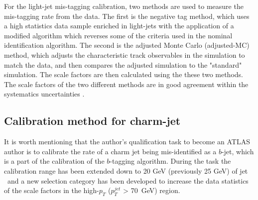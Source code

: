\documentclass[letterpaper,12pt]{article}
\begin{document}
For the light-jet mis-tagging calibration, two methods are 
used to measure the mis-tagging rate from the data. The first is the 
negative tag method, which uses a high statistics data sample enriched 
in light-jets with the application of a modified algorithm which 
reverses some of the criteria used in the nominal identification 
algorithm.
The second is the adjusted Monte Carlo (adjusted-MC) method, which 
adjusts the characteristic track observables in the simulation 
to match the data, and then compares the adjusted simulation to the 
"standard" simulation. The scale factors are then calculated using 
the these two methods. The scale factors of the two different methods 
are in good agreement within the systematics uncertainties \cite{ATLAS-CONF-2018-006}. 



\subsection{Calibration method for charm-jet}


\label{sec:Introduction}
It is worth mentioning that the author's qualification task to become an ATLAS author is to 
calibrate the rate of a charm jet being mis-identified as a $b$-jet, which is a part 
of the calibration of the $b$-tagging algorithm.
During the task the calibration range has been extended down to 20 GeV (previously 25 GeV) of
jet \pt\ and a new selection category has been developed 
to increase the data statistics of the scale factors in the 
high-$p_T$ ($p_T^{jet}$ > 70~GeV) region.
\end{document}
